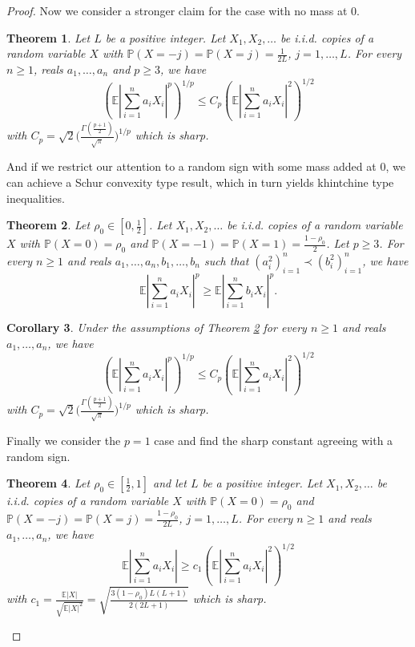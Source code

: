 \documentclass[10pt]{article}
\newcommand{\E}{\mathbb{E}}
\newcommand{\1}{\textbf{1}}
\newcommand{\p}[1]{\mathbb{P}\left( #1 \right)}
\newtheorem{theorem}{Theorem}
\newtheorem{corollary}[theorem]{Corollary}
\theoremstyle{remark}
\theoremstyle{definition}
\begin{document}
\begin{proof}
Now we consider a stronger claim for the case with no mass at 0.

\begin{theorem}\label{thm:2-p>3}
Let $L$ be a positive integer. Let $X_1,X_2,\ldots$ be i.i.d. copies of a random variable $X$ with $\p{X = -j} = \p{X = j} = \frac{1}{2L}$, $j = 1, \ldots, L$. For every $n \geq 1$, reals $a_1,\ldots,a_n$ and $p \geq 3$, we have
\begin{equation}\label{eq:2-p>3}
\left(\E\left|\sum_{i=1}^n a_iX_i \right|^p\right)^{1/p} \leq C_p \left(\E\left|\sum_{i=1}^n a_iX_i \right|^2\right)^{1/2} 
\end{equation}
with $C_p = \sqrt{2} \Big(\frac{\Gamma (\frac{p+1}{2})}{\sqrt{\pi}} \Big)^{1/p}$ which is sharp.
\end{theorem}

And if we restrict our attention to a random sign with some mass added at 0, we can achieve a Schur convexity type result, which in turn yields khintchine type inequalities.

\begin{theorem}\label{thm:Schur}
Let $\rho_0 \in [0,\frac{1}{2}]$. Let $X_1,X_2,\ldots$ be i.i.d. copies of a random variable $X$ with $\p{X = 0} = \rho_0$ and $\p{X = -1} = \p{X = 1} = \frac{1-\rho_0}{2}$. Let $p \geq 3$. For every $n \geq 1$ and reals $a_1,\ldots,a_n, b_1, \ldots, b_n$ such that $(a_i^2)_{i=1}^n \prec (b_i^2)_{i=1}^n$, we have
\begin{equation}\label{eq:Schur}
\E\left|\sum_{i=1}^n a_iX_i \right|^p \geq \E\left|\sum_{i=1}^n b_iX_i \right|^p.
\end{equation}
\end{theorem}

\begin{corollary}
Under the assumptions of Theorem \ref{thm:Schur} for every $n \geq 1$ and reals $a_1,\ldots,a_n$, we have
\begin{equation}\label{eq:2-p>3'}
\left(\E\left|\sum_{i=1}^n a_iX_i \right|^p\right)^{1/p} \leq C_p \left(\E\left|\sum_{i=1}^n a_iX_i \right|^2\right)^{1/2} 
\end{equation}
with $C_p = \sqrt{2} \Big(\frac{\Gamma (\frac{p+1}{2})}{\sqrt{\pi}} \Big)^{1/p}$ which is sharp.
\end{corollary}

Finally we consider the $p=1$ case and find the sharp constant agreeing with a random sign.

\begin{theorem}\label{thm:L1-L2}
Let $\rho_0 \in [\frac{1}{2},1]$ and let $L$ be a positive integer. Let $X_1,X_2,\ldots$ be i.i.d. copies of a random variable $X$ with $\p{X = 0} = \rho_0$ and $\p{X = -j} = \p{X = j} = \frac{1-\rho_0}{2L}$, $j = 1, \ldots, L$. For every $n \geq 1$ and reals $a_1,\ldots,a_n$, we have
\begin{equation}\label{eq:L1-L2}
\E\left|\sum_{i=1}^n a_iX_i \right| \geq c_1\left(\E\left|\sum_{i=1}^n a_iX_i \right|^2\right)^{1/2} 
\end{equation}
with $c_1 = \frac{\E|X|}{\sqrt{\E|X|^2}} = \sqrt{\frac{3(1-\rho_0)L(L+1)}{2(2L+1)}}$ which is sharp.
\end{theorem}



\end{proof}
\end{document}
